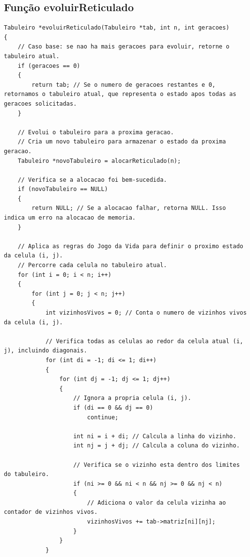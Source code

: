 \documentclass{article}
\begin{document}
\subsection{Função evoluirReticulado}
\begin{lstlisting}[caption={},label={lst:cod1},language={[x86masm]Assembler}]
Tabuleiro *evoluirReticulado(Tabuleiro *tab, int n, int geracoes)
{
    // Caso base: se nao ha mais geracoes para evoluir, retorne o tabuleiro atual.
    if (geracoes == 0)
    {
        return tab; // Se o numero de geracoes restantes e 0, retornamos o tabuleiro atual, que representa o estado apos todas as geracoes solicitadas.
    }

    // Evolui o tabuleiro para a proxima geracao.
    // Cria um novo tabuleiro para armazenar o estado da proxima geracao.
    Tabuleiro *novoTabuleiro = alocarReticulado(n);

    // Verifica se a alocacao foi bem-sucedida.
    if (novoTabuleiro == NULL)
    {
        return NULL; // Se a alocacao falhar, retorna NULL. Isso indica um erro na alocacao de memoria.
    }

    // Aplica as regras do Jogo da Vida para definir o proximo estado da celula (i, j).
    // Percorre cada celula no tabuleiro atual.
    for (int i = 0; i < n; i++)
    {
        for (int j = 0; j < n; j++)
        {
            int vizinhosVivos = 0; // Conta o numero de vizinhos vivos da celula (i, j).

            // Verifica todas as celulas ao redor da celula atual (i, j), incluindo diagonais.
            for (int di = -1; di <= 1; di++)
            {
                for (int dj = -1; dj <= 1; dj++)
                {
                    // Ignora a propria celula (i, j).
                    if (di == 0 && dj == 0)
                        continue;

                    int ni = i + di; // Calcula a linha do vizinho.
                    int nj = j + dj; // Calcula a coluna do vizinho.

                    // Verifica se o vizinho esta dentro dos limites do tabuleiro.
                    if (ni >= 0 && ni < n && nj >= 0 && nj < n)
                    {
                        // Adiciona o valor da celula vizinha ao contador de vizinhos vivos.
                        vizinhosVivos += tab->matriz[ni][nj];
                    }
                }
            }


\end{lstlisting}
\end{document}
